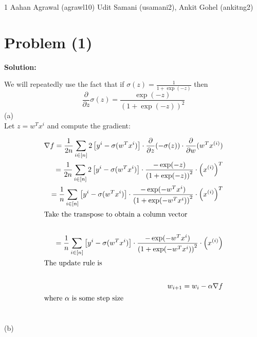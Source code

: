 \documentclass[../main.tex]{subfiles}
\begin{document}
\homework
    {1}
    {Aahan Agrawal (agrawl10)}
    {Udit Samani (usamani2), Ankit Gohel (ankitng2)}

\section*{Problem (1)}
\textbf{Solution:} 

We will repeatedly use the fact that if $\sigma(z) = \frac{1}{1 + \exp(-z)}$ then\[ \frac{\partial}{\partial z}\sigma(z) = \frac{\exp(-z)}{\left(1 + \exp(-z)\right)^2} \]
(a)\\

Let $z = w^Tx^{i}$ and compute the gradient:

\begin{align*}
    \nabla f = \frac{1}{2n}\sum_{i \in [n]}^{}2\left[y^{i} - \sigma(w^Tx^{i})\right] \cdot \frac{\partial}{\partial z}(-\sigma(z)) \cdot \frac{\partial}{\partial w}(w^Tx^{(i)}) \\
    = \frac{1}{2n}\sum_{i \in [n]}^{}2\left[y^{i} - \sigma(w^Tx^{i})\right] \cdot  \frac{- \exp(-z)}{\left(1 + \exp(-z)\right)^2} \cdot \left(x^{(i)}\right)^T \\
    = \frac{1}{n}\sum_{i \in [n]}^{}\left[y^{i} - \sigma(w^Tx^{i})\right] \cdot  \frac{- \exp(-w^Tx^{i})}{\left(1 + \exp(-w^Tx^{i})\right)^2} \cdot \left(x^{(i)}\right)^T \\
    \intertext{Take the transpose to obtain a column vector} \\
    = \frac{1}{n}\sum_{i \in [n]}^{}\left[y^{i} - \sigma(w^Tx^{i})\right] \cdot  \frac{- \exp(-w^Tx^{i})}{\left(1 + \exp(-w^Tx^{i})\right)^2} \cdot \left(x^{(i)}\right) \\
    \intertext{The update rule is} \\
    w_{i+1} = w_{i} - \alpha \nabla f \\
    \intertext{where $\alpha$ is some step size} \\
\end{align*}

(b) \\
\end{document}
